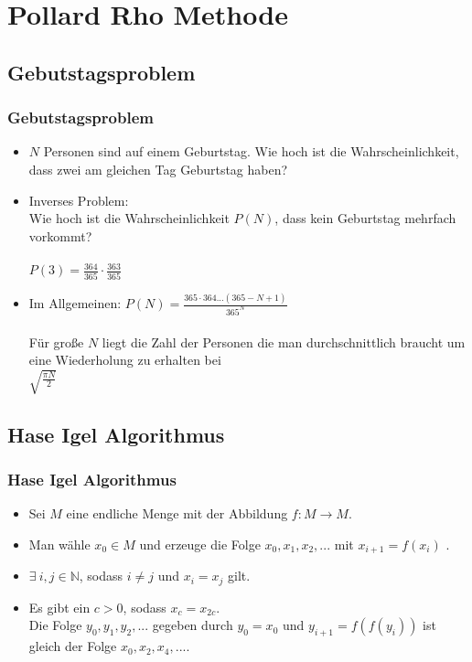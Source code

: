 \documentclass[mathserif, compress, german]{beamer}
\begin{document}
\section{Pollard Rho Methode}

\subsection{Gebutstagsproblem}

\begin{frame}
  \frametitle{Gebutstagsproblem}
  \begin{itemize}
    \item<2-> $N$ Personen sind auf einem Geburtstag. Wie hoch ist die Wahrscheinlichkeit, dass zwei am gleichen Tag Geburtstag haben?
    \vspace{3mm}
    \item<3-> Inverses Problem: \\ Wie hoch ist die Wahrscheinlichkeit $P(N)$, dass kein Geburtstag mehrfach vorkommt?\\
    \ \\ $P(3)=\frac{364}{365}\cdot \frac{363}{365}$
    \vspace{3mm}
    \item<4-> Im Allgemeinen: $P(N)=\frac{365\cdot 364...(365-N+1)}{365^N}$\\
    \ \\     F\"ur gro\ss{}e $N$ liegt die Zahl der Personen die man durchschnittlich braucht um eine Wiederholung zu erhalten bei \\
	     $\sqrt{\frac{\pi N}{2}}$
  \end{itemize}
\end{frame}

\subsection{Hase Igel Algorithmus}

\begin{frame}
  \frametitle{Hase Igel Algorithmus}
  \begin{itemize}
    \item<2-> Sei $M$ eine endliche Menge mit der Abbildung $f : M \rightarrow M$.
      \vspace{3mm}
    \item<3-> Man w\"ahle $x_0 \in M$ und erzeuge die Folge $x_0, x_1, x_2,...$ mit $x_{i+1} = f(x_i)$ .
      \vspace{3mm}
    \item<4-> $\exists \ i,j \in \mathbb{N}$, sodass $i \not= j$ und $x_i = x_j$ gilt.
      \vspace{3mm}
    \item<5-> Es gibt ein $c>0$, sodass $x_c=x_{2c}$.\\
              Die Folge $y_0, y_1, y_2,...$ gegeben durch $y_0=x_0$ und $y_{i+1}=f(f(y_i))$ ist gleich der Folge $x_0,x_2,x_4,...$.
  \end{itemize}
\end{frame}
\end{document}
